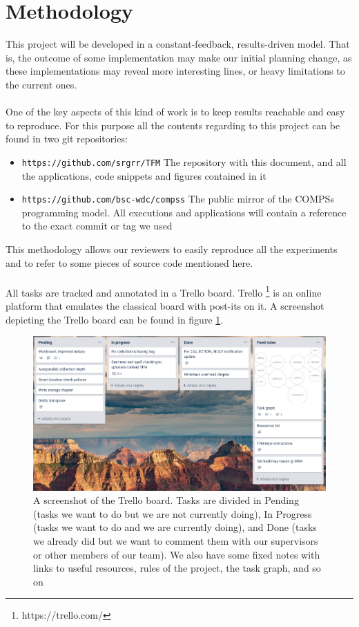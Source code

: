 \section{Methodology}
This project will be developed in a constant-feedback, results-driven model. That is, the outcome of some implementation may make our initial planning change, as these implementations may reveal more interesting lines, or heavy limitations to the current ones.\\
\\
One of the key aspects of this kind of work is to keep results reachable and easy to reproduce. For this purpose all the contents regarding to this project can be found in two git repositories:
\begin{itemize}
\item \verb|https://github.com/srgrr/TFM| The repository with this document, and all the applications, code snippets and figures contained in it
\item \verb|https://github.com/bsc-wdc/compss| The public mirror of the COMPSs programming model. All executions and applications will contain a reference to the exact commit or tag we used
\end{itemize}
This methodology allows our reviewers to easily reproduce all the experiments and to refer to some pieces of source code mentioned here.\\
\\
All tasks are tracked and annotated in a Trello board. Trello \footnote{https://trello.com/} is an online platform that emulates the classical board with post-its on it. A screenshot depicting the Trello board can be found in figure \ref{fig:trello}.

\begin{figure}
\centering
\includegraphics[scale = 0.5]{figures/trello.png}
\caption{A screenshot of the Trello board. Tasks are divided in Pending (tasks we want to do but we are not currently doing), In Progress (tasks we want to do and we are currently doing), and Done (tasks we already did but we want to comment them with our supervisors or other members of our team). We also have some fixed notes with links to useful resources, rules of the project, the task graph, and so on}
\label{fig:trello}
\end{figure}
